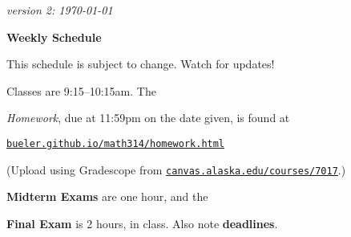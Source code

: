 \documentclass[12pt]{article}
\newcommand{\due}[1]{\strut {\color{BrickRed} \textsl{#1}}}
\newcommand{\ee}[1]{\strut {\color{Blue} \textbf{#1}}}
\newcommand{\dlinline}[1]{{\color{Purple} \textbf{#1}}}
\newcommand{\dl}[1]{{\small \dlinline{#1}}}
\begin{document}
\hfill \small \emph{version 2: \today} \normalsize

\bigskip\bigskip
\centerline{\Large \textbf{Weekly Schedule}}

\bigskip
This schedule is subject to change.  Watch for updates!

Classes are 9:15--10:15am.  The \due{Homework}, due at 11:59pm on the date given, is found at

 \quad \href{https://bueler.github.io/math314/homework.html}{\texttt{bueler.github.io/math314/homework.html}}
 
(Upload using Gradescope from \href{https://canvas.alaska.edu/courses/7017}{\texttt{canvas.alaska.edu/courses/7017}}.)  \ee{Midterm Exams} are one hour, and the \ee{Final Exam} is 2 hours, in class.  Also note \dl{deadlines}.

\bigskip
\end{document}
